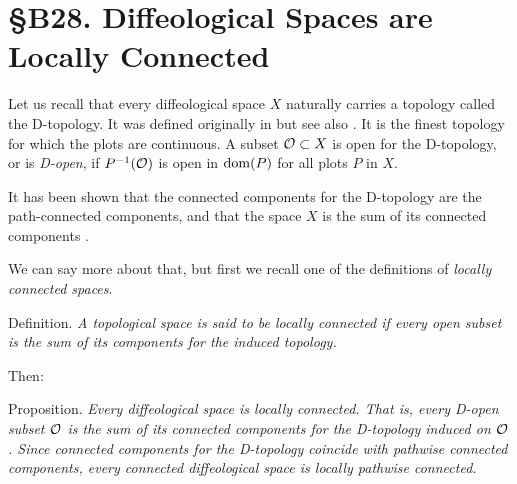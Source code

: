 
\chapter*{\S B28. Diffeological Spaces are Locally Connected}
\setcounter{footnote}{0}


\begin{abstract}
  Something that should have been said a long time ago:
  Every diffeological space is locally connected for the D-topology.
\end{abstract}

Let us recall that every diffeological space $X$ naturally carries a topology called the D-topology.
It was defined originally in \cite{Igl85} but see also \cite[\textsection\,2.8]{PIZ13}.
It is the finest topology for which the plots are continuous.
A subset $\mathcal{O} \subset X$ is open for the D-topology,
or is \emph{D-open},
if $P^{-1}(\mathcal{O})$ is open in $\mathrm{dom}(P)$ for all plots $P$ in $X$.

It has been shown that the connected components for the D-topology are the path-connected components,
and that the space $X$ is the sum of its connected components \cite[\textsection\,5.7, 5.8]{PIZ13}.

We can say more about that,
but first we recall one of the definitions of \emph{locally connected spaces}.

\begin{Article}{Definition.}{\itshape
  A topological space is said to be \emph{locally connected} if every open subset is the sum of its components
  for the induced topology.
}
\end{Article}

Then:

\begin{Article}{Proposition.}{\itshape
  Every diffeological space is locally connected.
  That is,
  every D-open subset $\mathcal{O}$ is the sum of its connected components for the D-topology induced on $\mathcal{O}$.
  Since connected components for the D-topology coincide with pathwise connected components,
  every connected diffeological space is locally pathwise connected.
}
\end{Article}

